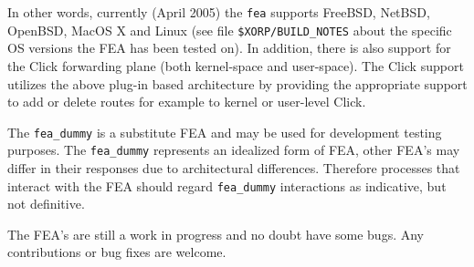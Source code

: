 \documentclass[11pt]{article}
\begin{document}
In other words, currently (April 2005) the {\tt fea} supports FreeBSD,
NetBSD, OpenBSD, MacOS X and Linux (see file {\tt \$XORP/BUILD\_NOTES}
about the specific OS versions the FEA has been tested on).
In addition, there is also support for the Click forwarding plane
(both kernel-space and user-space). The Click support utilizes the
above plug-in based architecture by providing the appropriate support
to add or delete routes for example to kernel or user-level Click.

The {\tt fea\_dummy} is a substitute FEA and may be
used for development testing purposes.  The {\tt fea\_dummy}
represents an idealized form of FEA, other FEA's may differ in their
responses due to architectural differences.  Therefore processes that
interact with the FEA should regard {\tt fea\_dummy} interactions as
indicative, but not definitive.

The FEA's are still a work in progress and no doubt have some bugs.
Any contributions or bug fixes are welcome.




\end{document}
